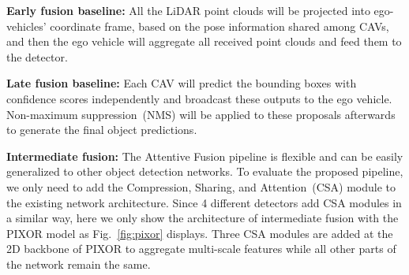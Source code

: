 \documentclass[letterpaper, 10 pt, conference]{ieeeconf}  %
\begin{document}
\noindent\textbf{Early fusion baseline: }All the LiDAR point clouds will be projected into ego-vehicles' coordinate frame, based on the pose information shared among CAVs, and then the ego vehicle will aggregate all received point clouds and feed them to the detector.

\noindent\textbf{Late fusion baseline: } Each CAV will predict the bounding boxes with confidence scores independently and broadcast these outputs to the ego vehicle. Non-maximum suppression~(NMS) will be applied to these proposals afterwards to generate the final object predictions.

\noindent\textbf{Intermediate fusion: }The Attentive Fusion pipeline is flexible and can be easily generalized to other object detection networks. To evaluate the proposed pipeline, we only need to add the Compression, Sharing, and Attention~(CSA) module to the existing network architecture. Since 4 different detectors add CSA modules in a similar way, here we only show the architecture of intermediate fusion with the PIXOR model as Fig.~\ref{fig:pixor} displays.  Three CSA modules are added at the 2D backbone of PIXOR to aggregate multi-scale features while all other parts of the network remain the same. 
\end{document}
